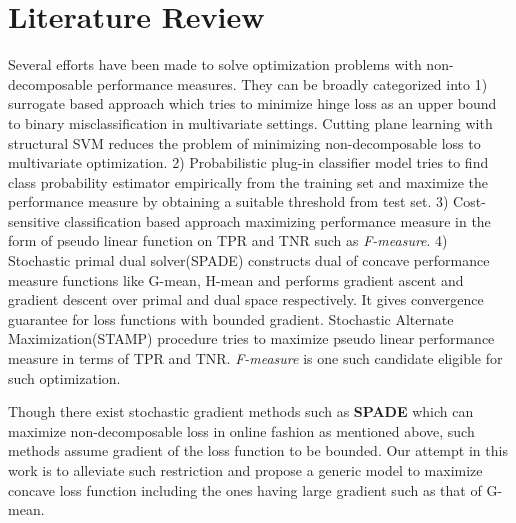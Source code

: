\documentclass{article} %
\begin{document}
\section{Literature Review}
Several efforts have been made to solve optimization problems with non-decomposable performance measures. They can be broadly categorized into 1) surrogate based approach which tries to minimize hinge loss as an upper bound to binary misclassification in multivariate settings. Cutting plane learning with structural SVM \cite{c4} reduces the problem of minimizing non-decomposable loss to multivariate optimization. 2) Probabilistic plug-in classifier\cite{c3} model tries to find class probability estimator empirically from the training set and maximize the performance measure by obtaining a suitable threshold from test set. 3) Cost-sensitive classification based approach\cite{c6} maximizing performance measure in the form of pseudo linear function on TPR and TNR such as \textit{F-measure}. 4) Stochastic primal dual solver(SPADE)\cite{c2} constructs dual of concave performance measure functions like G-mean, H-mean and performs gradient ascent and gradient descent over primal and dual space respectively. It gives convergence guarantee for loss functions with bounded gradient. Stochastic Alternate Maximization(STAMP)\cite{c2} procedure tries to maximize pseudo linear performance measure in terms of TPR and TNR. \textit{F-measure} is one such candidate eligible for such optimization.

Though there exist stochastic gradient methods such as \textbf{SPADE} which can maximize non-decomposable loss in online fashion\cite{c2} as mentioned above, such methods assume gradient of the loss function to be bounded. Our attempt in this work is to alleviate such restriction and propose a generic model to maximize concave loss function including the ones having large gradient such as that of G-mean.
\end{document}
